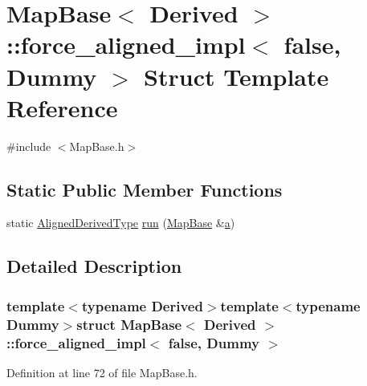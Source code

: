 \hypertarget{struct_map_base_1_1force__aligned__impl_3_01false_00_01_dummy_01_4}{\section{Map\-Base$<$ Derived $>$\-:\-:force\-\_\-aligned\-\_\-impl$<$ false, Dummy $>$ Struct Template Reference}
\label{struct_map_base_1_1force__aligned__impl_3_01false_00_01_dummy_01_4}
}


{\ttfamily \#include $<$Map\-Base.\-h$>$}

\subsection*{Static Public Member Functions}
\begin{DoxyCompactItemize}
\item 
static \hyperlink{class_map_base_a57c5a3543f137919cfd9aba5aa05005a}{Aligned\-Derived\-Type} \hyperlink{struct_map_base_1_1force__aligned__impl_3_01false_00_01_dummy_01_4_a58f03a68ea8e6ea737976dd015a1a21b}{run} (\hyperlink{class_map_base}{Map\-Base} \&\hyperlink{glext_8h_ac8729153468b5dcf13f971b21d84d4e5}{a})
\end{DoxyCompactItemize}


\subsection{Detailed Description}
\subsubsection*{template$<$typename Derived$>$template$<$typename Dummy$>$struct Map\-Base$<$ Derived $>$\-::force\-\_\-aligned\-\_\-impl$<$ false, Dummy $>$}



Definition at line 72 of file Map\-Base.\-h.



